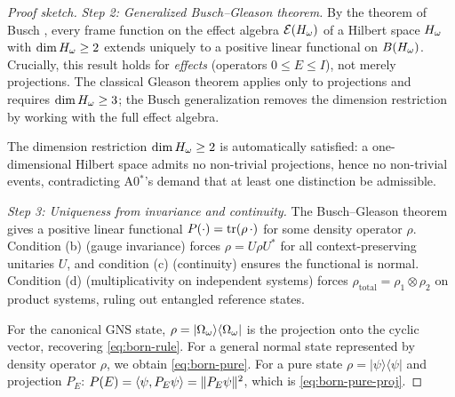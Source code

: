 \begin{theorem}
\begin{proof}[Proof sketch]
\emph{Step 2: Generalized Busch--Gleason theorem.}
By the theorem of Busch \citep{busch2003}, every frame function on the
effect algebra $\mathcal{E}(H_\omega)$ of a Hilbert space $H_\omega$ with
$\dim H_\omega \geq 2$ extends uniquely to a positive linear functional
on $B(H_\omega)$.  Crucially, this result holds for \emph{effects}
(operators $0 \leq E \leq I$), not merely projections.  The classical
Gleason theorem \citep{gleason1957} applies only to projections and
requires $\dim H_\omega \geq 3$; the Busch generalization removes the
dimension restriction by working with the full effect algebra.

The dimension restriction $\dim H_\omega \geq 2$ is automatically
satisfied: a one-dimensional Hilbert space admits no non-trivial
projections, hence no non-trivial events, contradicting A0$^*$'s
demand that at least one distinction be admissible.

\emph{Step 3: Uniqueness from invariance and continuity.}
The Busch--Gleason theorem gives a positive linear functional
$P(\cdot) = \mathrm{tr}(\rho\, \cdot)$ for some density
operator $\rho$.  Condition (b) (gauge invariance) forces
$\rho = U \rho U^*$ for all context-preserving unitaries $U$, and
condition (c) (continuity) ensures the functional is normal.
Condition (d) (multiplicativity on independent systems) forces
$\rho_{\mathrm{total}} = \rho_1 \otimes \rho_2$ on product systems,
ruling out entangled reference states.

For the canonical GNS state, $\rho = |\Omega_\omega\rangle\langle\Omega_\omega|$
is the projection onto the cyclic vector, recovering
\cref{eq:born-rule}.  For a general normal state represented by
density operator $\rho$, we obtain \cref{eq:born-pure}.  For a pure
state $\rho = |\psi\rangle\langle\psi|$ and projection $P_E$:
$P(E) = \langle\psi, P_E \psi\rangle = \|P_E\psi\|^2$,
which is \cref{eq:born-pure-proj}.


\end{proof}
\end{theorem}
